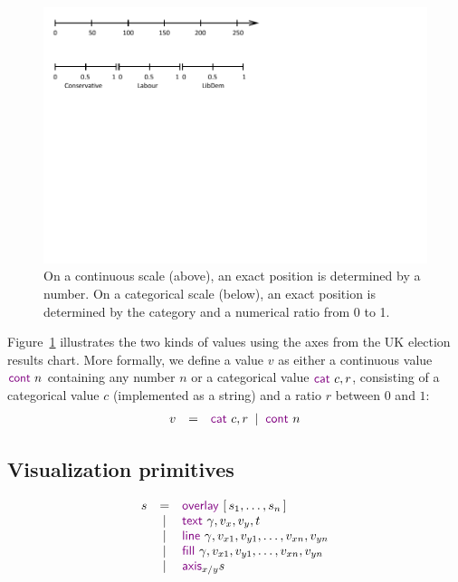 \documentclass{jfp}
\newcommand{\lsep}{\;\;|\;\;}
\newcommand{\kvd}[1]{\textnormal{\textcolor{kvdclr}{\sffamily #1}}}
\begin{document}
\begin{figure}
\includegraphics[scale=1,trim={0cm 6.5cm 6cm 0cm},clip]{figures/values.pdf}
\caption{On a continuous scale (above), an exact position is determined by a number.
  On a categorical scale (below), an exact position is determined by the category and a
  numerical ratio from 0 to 1.}
\label{fig:scales}
\end{figure}

Figure~\ref{fig:scales} illustrates the two kinds of values using the axes from the UK
election results chart. More formally, we define a value $v$ as either a continuous value
$\kvd{cont}~n$ containing any number $n$ or a categorical value $\kvd{cat}~c, r$, consisting
of a categorical value $c$ (implemented as a string) and a ratio $r$ between $0$ and $1$:
%
\begin{equation*}
\begin{array}{rcl}
v & = & \kvd{cat}~c, r \lsep \kvd{cont}~n
\end{array}
\end{equation*}

\vspace{-2.5em}
\subsection{Visualization primitives}

\begin{equation*}
\begin{array}{rcl}
s & = & \kvd{overlay}~[\,s_1, \ldots, s_n\,]\\
 & | & \kvd{text}~\gamma, v_x, v_y, t\\
 & | & \kvd{line}~\gamma, v_{x1}, v_{y1}, \ldots, v_{xn}, v_{yn}\\
 & | & \kvd{fill}~\gamma, v_{x1}, v_{y1}, \ldots, v_{xn}, v_{yn}\\
 & | & \kvd{axis}_{x/y} s
\end{array}
\end{equation*}
\end{document}

